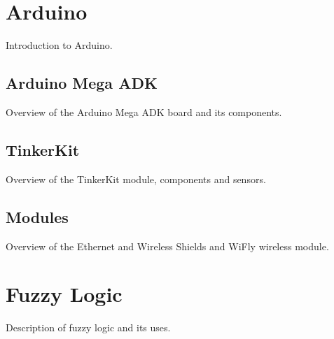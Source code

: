\section{Arduino}
Introduction to Arduino.

\subsection{Arduino Mega ADK}
Overview of the Arduino Mega ADK board and its components.

\subsection{TinkerKit}
Overview of the TinkerKit module, components and sensors.

\subsection{Modules}
Overview of the Ethernet and Wireless Shields and WiFly wireless module.

\section{Fuzzy Logic}
Description of fuzzy logic and its uses.






